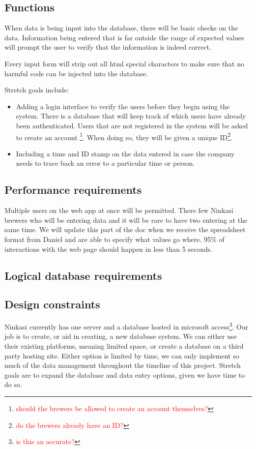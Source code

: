 \documentclass[draftclsnofoot,onecolumn,letterpaper,10pt,compsoc]{IEEEtran}
\newcommand\question[1]{\footnote{\textcolor{red}{#1}}}
\begin{document}
	\subsection{Functions}

		When data is being input into the database, there will be basic checks on the data.
		Information being entered that is far outside the range of expected values will prompt the user to verify that the information is indeed correct.

		Every input form will strip out all html special characters to make sure that no harmful code can be injected into the database.

		Stretch goals include:
		\begin{itemize}
			\item{Adding a login interface to verify the users before they begin using the system.
			There is a database that will keep track of which users have already been authenticated.
			Users that are not registered in the system will be asked to create an account \question{should the brewers be allowed to create an account themselves?}.
			When doing so, they will be given a unique ID\question{do the brewers already have an ID?}.}

			\item{Including a time and ID stamp on the data entered in case the company needs to trace back an error to a particular time or person.}
		\end{itemize}

	\subsection{Performance requirements}
		Multiple users on the web app at once will be permitted.
		There few Ninkasi brewers who will be entering data and it will be rare to have two entering at the same time.
		We will update this part of the doc when we receive the spreadsheet format from Daniel and are able to specify what values go where.
		95\% of interactions with the web page should happen in less than 5 seconds.

	\subsection{Logical database requirements}

	\subsection{Design constraints}
		Ninkasi currently has one server and a database hosted in microsoft access\question{is this an accurate?}.
		Our job is to create, or aid in creating, a new database system.
		We can either use their existing platforms, meaning limited space, or create a database on a third party hosting site.
		Either option is limited by time, we can only implement so much of the data management throughout the timeline of this project.
		Stretch goals are to expand the database and data entry options, given we have time to do so.
\end{document}
